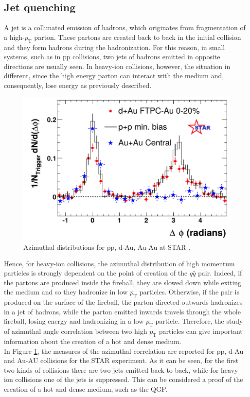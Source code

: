 \subsection{Jet quenching}
A jet is a collimated emission of hadrons, which originates from fragmentation of a high-$p_{\mathrm{T}}$ parton. These partons are created back to back in the initial collision and they form hadrons during the hadronization. For this reason, in small systems, such as in pp collisions, two jets of hadrons emitted in opposite directions are usually seen. In heavy-ion collisions, however, the situation in different, since the high energy parton can interact with the medium and, consequently, lose energy as previously described.
%
\begin{figure}
  \centering
  \includegraphics[scale=0.3]{figures/zoomstar.png}
  \caption{Azimuthal distributions for pp, d-Au, Au-Au at STAR \cite{jets}.}
  \label{fig:jet}
\end{figure}
%
Hence, for heavy-ion collisions, the azimuthal distribution of high momentum particles is strongly dependent on the point of creation of the $q\bar{q}$ pair. Indeed, if the partons are produced inside the fireball, they are slowed down while exiting the medium and so they hadronize in low $p_{\mathrm{T}}$ particles. Otherwise, if the pair is produced on the surface of the fireball, the parton directed outwards hadronizes in a jet of hadrons, while the parton emitted inwards travels through the whole fireball, losing energy and hadronizing in a low $p_{\mathrm{T}}$ particle. Therefore, the study of azimuthal angle correlation between two high $p_{\mathrm{T}}$ particles can give important information about the creation of a hot and dense medium.\\
In Figure \ref{fig:jet}, the measures of the azimuthal correlation are reported for pp, d-Au and Au-AU collisions for the STAR experiment. As it can be seen, for the first two kinds of collisions there are two jets emitted back to back, while for heavy-ion collisions one of the jets is suppressed. This can be considered a proof of the creation of a hot and dense medium, such as the QGP.
%
